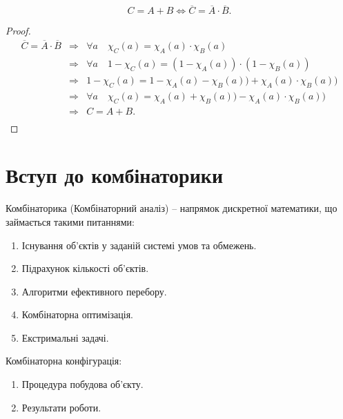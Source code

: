 \begin{claim}
    $$C = A + B \Leftrightarrow \overline{C} = \overline{A} \cdot \overline{B}.$$
\end{claim}
\begin{proof}
    $$\begin{array}{rcl}
        \overline{C} = \overline{A} \cdot \overline{B}
        & \Rightarrow & \forall a \quad \chi_{C}(a) = \chi_{A}(a) \cdot \chi_{B}(a) \\
        & \Rightarrow & \forall a \quad 1 - \chi_{C}(a) = (1-\chi_{A}(a)) \cdot (1 - \chi_{B}(a)) \\
        & \Rightarrow & 1 - \chi_{C}(a) = 1 - \chi_{A}(a) - \chi_{B}(a)) + \chi_{A}(a) \cdot \chi_{B}(a)) \\
        & \Rightarrow & \forall a \quad \chi_{C}(a) = \chi_{A}(a) + \chi_{B}(a)) - \chi_{A}(a) \cdot \chi_{B}(a)) \\
        & \Rightarrow & C = A + B. \\
    \end{array}$$
\end{proof}

\section{Вступ до комбінаторики}

\begin{definition}
    Комбінаторика (Комбінаторний аналіз) -- напрямок дискретної
    математики, що займається такими питаннями:
    \begin{enumerate}
        \item Існування об'єктів у заданій системі умов та обмежень.
        \item Підрахунок кількості об'єктів.
        \item Алгоритми ефективного перебору.
        \item Комбінаторна оптимізація.
        \item Екстримальні задачі.
    \end{enumerate}
\end{definition}



Комбінаторна конфігурація:
\begin{enumerate}
    \item Процедура побудова об'єкту.
    \item Результати роботи.
\end{enumerate}



